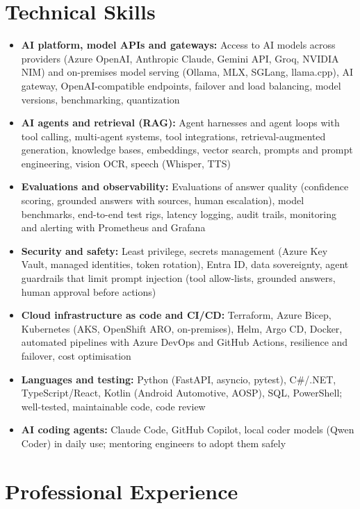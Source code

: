 \documentclass[a4paper,10pt]{article}
\begin{document}
\section*{Technical Skills}
\begin{itemize}
  \item \textbf{AI platform, model APIs and gateways:} Access to AI models across providers (Azure OpenAI, Anthropic Claude, Gemini API, Groq, NVIDIA NIM) and on-premises model serving (Ollama, MLX, SGLang, llama.cpp), AI gateway, OpenAI-compatible endpoints, failover and load balancing, model versions, benchmarking, quantization
  \item \textbf{AI agents and retrieval (RAG):} Agent harnesses and agent loops with tool calling, multi-agent systems, tool integrations, retrieval-augmented generation, knowledge bases, embeddings, vector search, prompts and prompt engineering, vision OCR, speech (Whisper, TTS)
  \item \textbf{Evaluations and observability:} Evaluations of answer quality (confidence scoring, grounded answers with sources, human escalation), model benchmarks, end-to-end test rigs, latency logging, audit trails, monitoring and alerting with Prometheus and Grafana
  \item \textbf{Security and safety:} Least privilege, secrets management (Azure Key Vault, managed identities, token rotation), Entra ID, data sovereignty, agent guardrails that limit prompt injection (tool allow-lists, grounded answers, human approval before actions)
  \item \textbf{Cloud infrastructure as code and CI/CD:} Terraform, Azure Bicep, Kubernetes (AKS, OpenShift ARO, on-premises), Helm, Argo CD, Docker, automated pipelines with Azure DevOps and GitHub Actions, resilience and failover, cost optimisation
  \item \textbf{Languages and testing:} Python (FastAPI, asyncio, pytest), C\#/.NET, TypeScript/React, Kotlin (Android Automotive, AOSP), SQL, PowerShell; well-tested, maintainable code, code review
  \item \textbf{AI coding agents:} Claude Code, GitHub Copilot, local coder models (Qwen Coder) in daily use; mentoring engineers to adopt them safely
\end{itemize}

\section*{Professional Experience}
\end{document}
